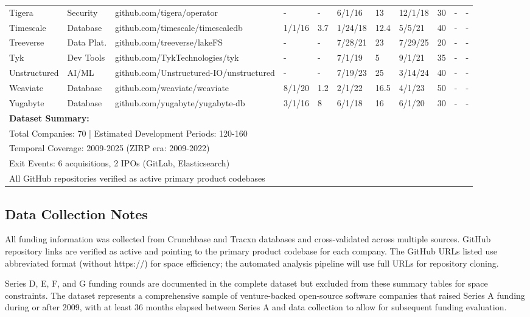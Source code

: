 \begin{landscape}
\begin{table}[htbp]
\begin{tabular}{|p{2.2cm}|p{1.6cm}|p{4cm}|p{1.1cm}|p{0.9cm}|p{1.1cm}|p{0.9cm}|p{1.1cm}|p{0.9cm}|p{1.3cm}|p{1.1cm}|}
Tigera & Security & github.com/tigera/operator & - & - & 6/1/16 & 13 & 12/1/18 & 30 & - & - \\
Timescale & Database & github.com/timescale/timescaledb & 1/1/16 & 3.7 & 1/24/18 & 12.4 & 5/5/21 & 40 & - & - \\
Treeverse & Data Plat. & github.com/treeverse/lakeFS & - & - & 7/28/21 & 23 & 7/29/25 & 20 & - & - \\
Tyk & Dev Tools & github.com/TykTechnologies/tyk & - & - & 7/1/19 & 5 & 9/1/21 & 35 & - & - \\
Unstructured & AI/ML & github.com/Unstructured-IO/unstructured & - & - & 7/19/23 & 25 & 3/14/24 & 40 & - & - \\
Weaviate & Database & github.com/weaviate/weaviate & 8/1/20 & 1.2 & 2/1/22 & 16.5 & 4/1/23 & 50 & - & - \\
Yugabyte & Database & github.com/yugabyte/yugabyte-db & 3/1/16 & 8 & 6/1/18 & 16 & 6/1/20 & 30 & - & - \\
\hline
\multicolumn{11}{|l|}{\textbf{Dataset Summary:}} \\
\multicolumn{11}{|l|}{Total Companies: 70 | Estimated Development Periods: 120-160} \\
\multicolumn{11}{|l|}{Temporal Coverage: 2009-2025 (ZIRP era: 2009-2022)} \\
\multicolumn{11}{|l|}{Exit Events: 6 acquisitions, 2 IPOs (GitLab, Elasticsearch)} \\
\multicolumn{11}{|l|}{All GitHub repositories verified as active primary product codebases} \\
\hline
\end{tabular}
\end{table}


\end{landscape}

\subsection{Data Collection Notes}

All funding information was collected from Crunchbase and Tracxn databases and cross-validated across multiple sources. GitHub repository links are verified as active and pointing to the primary product codebase for each company. The GitHub URLs listed use abbreviated format (without https://) for space efficiency; the automated analysis pipeline will use full URLs for repository cloning.

Series D, E, F, and G funding rounds are documented in the complete dataset but excluded from these summary tables for space constraints. The dataset represents a comprehensive sample of venture-backed open-source software companies that raised Series A funding during or after 2009, with at least 36 months elapsed between Series A and data collection to allow for subsequent funding evaluation.

\clearpage